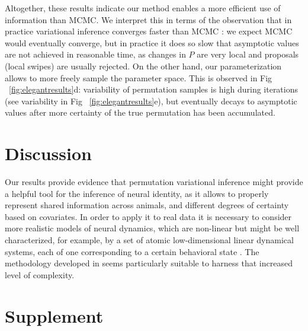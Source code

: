 \documentclass[twoside]{article}
\begin{document}
Altogether, these results indicate our method enables a more efficient use of information than MCMC. We interpret this in terms of the observation that in practice variational inference converges faster than MCMC \cite{Blei2017}: we expect MCMC would eventually converge, but in practice it does so slow that asymptotic values are not achieved in reasonable time, as changes in $P$ are very local and proposals (local swipes) are usually rejected. On the other hand, our parameterization allows to more freely sample the parameter space. This is observed in Fig  ~\ref{fig:elegantresults}d: variability of permutation samples is high during iterations (see variability in Fig ~\ref{fig:elegantresults}e), but eventually decays to asymptotic values after more certainty of the true permutation has been accumulated.
\section{Discussion}
Our results provide evidence that permutation variational inference
might provide a helpful tool for the inference of neural identity, as
it allows to properly represent shared information across animals, and
different degrees of certainty based on covariates. In order to apply
it to real data it is necessary to consider more realistic models of
neural dynamics, which are non-linear but might be well characterized,
for example, by a set of atomic low-dimensional linear dynamical
systems, each of one corresponding to a certain behavioral state
\cite{Kato2015}. The methodology developed in \cite{Linderman2016}
seems particularly suitable to harness that increased level of
complexity.





\pagebreak 
\appendix


\section*{Supplement}
\end{document}

